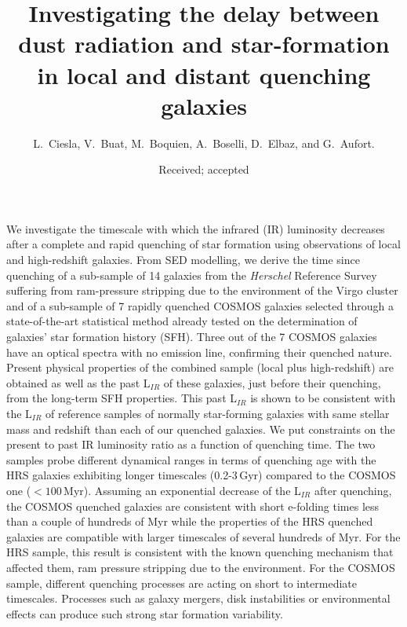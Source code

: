\documentclass[traditabstract]{aa} %
\begin{document}
\title{Investigating the delay between dust radiation and star-formation in
local and distant quenching galaxies}

\author{L.~Ciesla,
        V.~Buat,
        M.~Boquien, 
        A.~Boselli,
        D.~Elbaz,
        and G.~Aufort.
}



   \date{Received; accepted}

 
  \abstract
{
We investigate the timescale with which the infrared (IR) luminosity decreases after a complete and rapid quenching of star formation using observations of local and high-redshift galaxies.
From SED modelling, we derive the time since quenching of a sub-sample of 14 galaxies from the \textit{Herschel} Reference Survey suffering from ram-pressure stripping due to the environment of the Virgo cluster and of a sub-sample of 7 rapidly quenched COSMOS galaxies selected through a state-of-the-art statistical method already tested on the determination of galaxies' star formation history (SFH).
Three out of the 7 COSMOS galaxies have an optical spectra with no emission line, confirming their quenched nature.
Present physical properties of the combined sample (local plus high-redshift) are obtained as well as the past L$_{IR}$ of these galaxies, just before their quenching, from the long-term SFH properties.
This past L$_{IR}$ is shown to be consistent with the L$_{IR}$ of reference samples of normally star-forming galaxies with same stellar mass and redshift than each of our quenched galaxies.
We put constraints on the present to past IR luminosity ratio as a function of quenching time.
The two samples probe different dynamical ranges in terms of quenching age with the HRS galaxies exhibiting longer timescales (0.2-3\,Gyr) compared to the COSMOS one ($<100$\,Myr).
Assuming an exponential decrease of the L$_{IR}$ after quenching, the COSMOS quenched galaxies are consistent with short e-folding times less than a couple of hundreds of Myr while the properties of the HRS quenched galaxies are compatible with larger timescales of several hundreds of Myr.
For the HRS sample, this result is consistent with the known quenching mechanism that affected them, ram pressure stripping due to the environment.
For the COSMOS sample, different quenching processes are acting on short to intermediate timescales.
Processes such as galaxy mergers, disk instabilities or environmental effects can produce such strong star formation variability.
}
\end{document}
